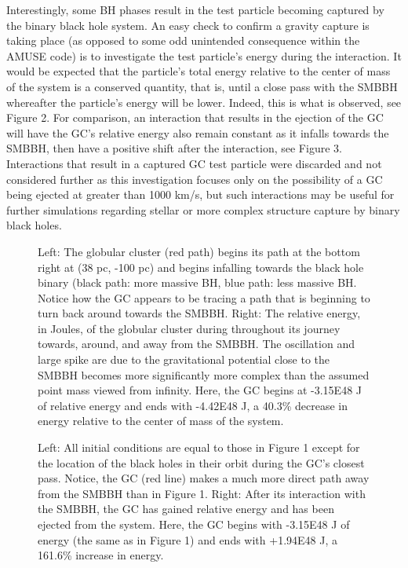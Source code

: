 \documentclass{aastex62}
\begin{document}
Interestingly, some BH phases result in the test particle becoming captured by the binary black hole system. An easy check to confirm a gravity capture is taking place (as opposed to some odd unintended consequence within the AMUSE code) is to investigate the test particle's energy during the interaction. It would be expected that the particle's total energy relative to the center of mass of the system is a conserved quantity, that is, until a close pass with the SMBBH whereafter the particle's energy will be lower. Indeed, this is what is observed, see Figure 2. For comparison, an interaction that results in the ejection of the GC will have the GC's relative energy also remain constant as it infalls towards the SMBBH, then have a positive shift after the interaction, see Figure 3. Interactions that result in a captured GC test particle were discarded and not considered further as this investigation focuses only on the possibility of a GC being ejected at greater than 1000 km/s, but such interactions may be useful for further simulations regarding stellar or more complex structure capture by binary black holes.

\begin{figure}

\caption{Left: The globular cluster (red path) begins its path at the bottom right at (38 pc, -100 pc) and begins infalling towards the black hole binary (black path: more massive BH, blue path: less massive BH. Notice how the GC appears to be tracing a path that is beginning to turn back around towards the SMBBH. Right: The relative energy, in Joules, of the globular cluster during throughout its journey towards, around, and away from the SMBBH. The oscillation and large spike are due to the gravitational potential close to the SMBBH becomes more significantly more complex than the assumed point mass viewed from infinity. Here, the GC begins at -3.15E48 J of relative energy and ends with -4.42E48 J, a 40.3\% decrease in energy relative to the center of mass of the system.}
\end{figure}

\begin{figure}

\caption{Left: All initial conditions are equal to those in Figure 1 except for the location of the black holes in their orbit during the GC's closest pass. Notice, the GC (red line) makes a much more direct path away from the SMBBH than in Figure 1. Right: After its interaction with the SMBBH, the GC has gained relative energy and has been ejected from the system. Here, the GC begins with -3.15E48 J of energy (the same as in Figure 1) and ends with +1.94E48 J, a 161.6\% increase in energy.}
\end{figure}
\end{document}
